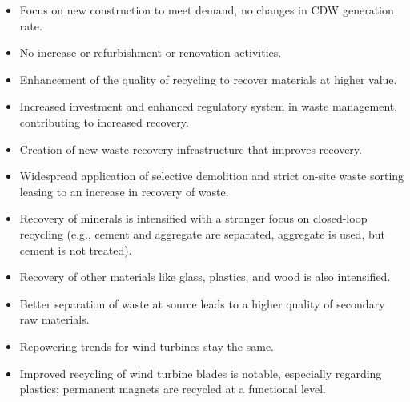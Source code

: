 \begin{itemize}
  \item Focus on new construction to meet demand, no changes in CDW generation rate.
  \item No increase or refurbishment or renovation activities.
  \item Enhancement of the quality of recycling to recover materials at higher value.
  \item Increased investment and enhanced regulatory system in waste management, contributing to increased recovery.
  \item Creation of new waste recovery infrastructure that improves recovery.
  \item Widespread application of selective demolition and strict on-site waste sorting leasing to an increase in recovery of waste.
  \item Recovery of minerals is intensified with a stronger focus on closed-loop recycling (e.g., cement and aggregate are separated, aggregate is used, but cement is not treated).
  \item Recovery of other materials like glass, plastics, and wood is also intensified.
  \item Better separation of waste at source leads to a higher quality of secondary raw materials.
  \item Repowering trends for wind turbines stay the same.
  \item Improved recycling of wind turbine blades is notable, especially regarding plastics; permanent magnets are recycled at a functional level.
\end{itemize}



